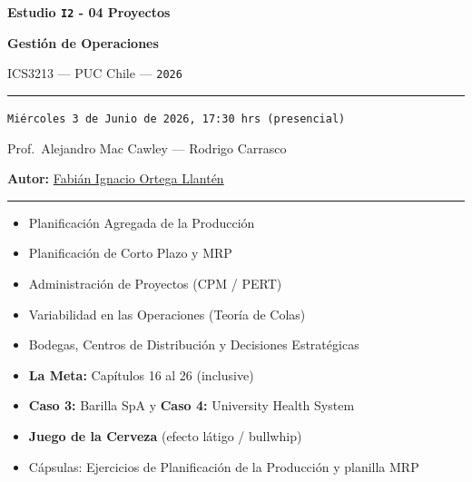\documentclass[11pt, a4paper]{article}
\begin{document}
\begin{titlepage}
  \centering
  \vspace*{2cm}
  {\Huge\bfseries\color{gopcyan} Estudio \texttt{I2} - 04 Proyectos\par}
  \vspace{0.4cm}
  {\LARGE\bfseries Gestión de Operaciones\par}
  \vspace{0.3cm}
  {\large ICS3213 --- PUC Chile --- \texttt{2026}\par}
  \vspace{1.2cm}
  \rule{\textwidth}{0.4pt}
  \vspace{0.4cm}

  {\normalsize \texttt{Miércoles 3 de Junio de 2026, 17:30 hrs (presencial)}\par}
  \vspace{0.2cm}
  {\small Prof.\ Alejandro Mac Cawley --- Rodrigo Carrasco\par}
  \vspace{0.2cm}
  {\small\textbf{Autor:} \href{https://cl.linkedin.com/in/fabian-ortega-llanten}{Fabián Ignacio Ortega Llantén}\par}
  \vspace{0.4cm}
  \rule{\textwidth}{0.4pt}
  \vspace{1cm}

  \begin{resumentemario}
    \begin{itemize}[leftmargin=1.2em, itemsep=2pt]
      \item Planificación Agregada de la Producción
      \item Planificación de Corto Plazo y MRP
      \item Administración de Proyectos (CPM / PERT)
      \item Variabilidad en las Operaciones (Teoría de Colas)
      \item Bodegas, Centros de Distribución y Decisiones Estratégicas
      \item \textbf{La Meta:} Capítulos 16 al 26 (inclusive)
      \item \textbf{Caso 3:} Barilla SpA \quad y \quad \textbf{Caso 4:} University Health System
      \item \textbf{Juego de la Cerveza} (efecto látigo / bullwhip)
      \item Cápsulas: Ejercicios de Planificación de la Producción y planilla MRP
    \end{itemize}
  \end{resumentemario}


\end{titlepage}
\end{document}

